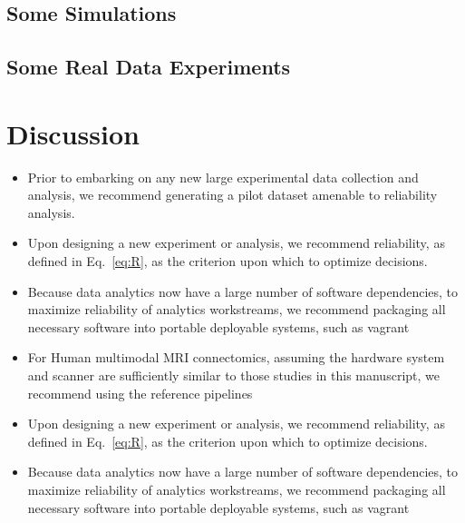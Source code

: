\documentclass{article}
\begin{document}
\subsection{Some Simulations}

\subsection{Some Real Data Experiments}



\section{Discussion}





\begin{itemize}
\item Prior to embarking on any new large experimental data collection and analysis, we recommend generating a pilot dataset amenable to reliability analysis.
\item Upon designing a new experiment or analysis, we recommend reliability, as defined in Eq.~\eqref{eq:R}, as the criterion upon which to optimize decisions.
\item Because data analytics now have a large number of software dependencies, to maximize reliability of analytics workstreams, we recommend packaging all necessary software into portable deployable systems, such as vagrant
\item For Human multimodal MRI connectomics, assuming the hardware system and scanner are sufficiently similar to those studies in this manuscript, we recommend using the reference pipelines  
\end{itemize}


\begin{itemize}
\item Upon designing a new experiment or analysis, we recommend reliability, as defined in Eq.~\eqref{eq:R}, as the criterion upon which to optimize decisions.
\item Because data analytics now have a large number of software dependencies, to maximize reliability of analytics workstreams, we recommend packaging all necessary software into portable deployable systems, such as vagrant
\end{itemize}




% 
% 
% 
% 
% 
% 
% 
% 
\end{document}

